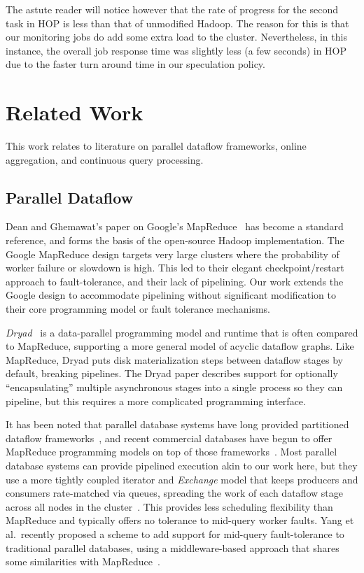 The astute reader will notice however that the rate of progress for the second
task in HOP is less than that of unmodified Hadoop.  The reason for this is
that our monitoring jobs do add some extra load to the cluster.  Nevertheless,
in this instance, the overall job response time was slightly less (a few
seconds) in HOP due to the faster turn around time in our speculation policy.


\section{Related Work}
\label{ch:hop:sec:relwork}

This work relates to literature on parallel dataflow frameworks, online
aggregation, and continuous query processing.

\subsection{Parallel Dataflow}

Dean and Ghemawat's paper on Google's MapReduce~\cite{mapreduce-osdi} has
become a standard reference, and forms the basis of the open-source Hadoop
implementation.  The Google MapReduce design targets very large clusters where
the probability of worker failure or slowdown is high.  This led to their
elegant checkpoint/restart approach to fault-tolerance, and their lack of
pipelining.  Our work extends the Google design to accommodate pipelining
without significant modification to their core programming model or fault
tolerance mechanisms.

{\em Dryad}~\cite{dryad07} is a data-parallel programming model and runtime
that is often compared to MapReduce, supporting a more general model of acyclic
dataflow graphs.  Like MapReduce, Dryad puts disk materialization steps between
dataflow stages by default, breaking pipelines.  The Dryad paper describes
support for optionally ``encapsulating'' multiple asynchronous stages into a
single process so they can pipeline, but this requires a more complicated
programming interface.

It has been noted that parallel database systems have long provided partitioned
dataflow frameworks~\cite{pavlo09}, and recent commercial databases have begun
to offer MapReduce programming models on top of those
frameworks~\cite{aster,greenplum}.  Most parallel database systems can provide
pipelined execution akin to our work here, but they use a more tightly coupled
iterator and {\em Exchange} model that keeps producers and consumers
rate-matched via queues, spreading the work of each dataflow stage across all
nodes in the cluster~\cite{exchange}.  This provides less scheduling
flexibility than MapReduce and typically offers no tolerance to mid-query
worker faults.  Yang et al.\ recently proposed a scheme to add support for
mid-query fault-tolerance to traditional parallel databases, using a
middleware-based approach that shares some similarities with
MapReduce~\cite{osprey-icde}.

